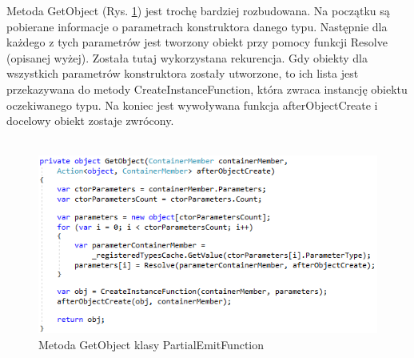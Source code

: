 \documentclass[12pt]{article}
\begin{document}
Metoda GetObject (Rys. \ref{fig:PartialEmitFunction_GetObject}) jest trochę bardziej rozbudowana. Na początku są pobierane informacje o parametrach konstruktora danego typu. Następnie dla każdego z tych parametrów jest tworzony obiekt przy pomocy funkcji Resolve (opisanej wyżej). Została tutaj wykorzystana rekurencja. Gdy obiekty dla wszystkich parametrów konstruktora zostały utworzone, to ich lista jest przekazywana do metody CreateInstanceFunction, która zwraca instancję obiektu oczekiwanego typu. Na koniec jest wywoływana funkcja afterObjectCreate i docelowy obiekt zostaje zwrócony.\\ \\
\begin{figure}[H]
	\begin{center}
  		\includegraphics{PartialEmitFunction_GetObject.png}
  		\caption{Metoda GetObject klasy PartialEmitFunction}
  		\label{fig:PartialEmitFunction_GetObject}
	\end{center}
\end{figure}
\end{document}
